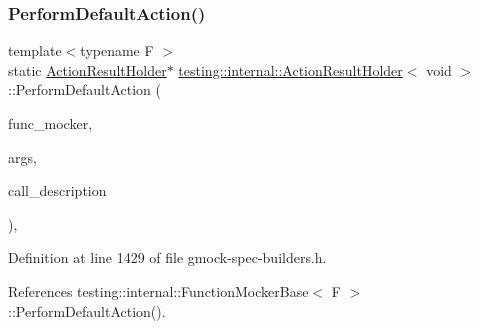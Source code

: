 \subsubsection{\texorpdfstring{Perform\+Default\+Action()}{PerformDefaultAction()}}
{\footnotesize\ttfamily template$<$typename F $>$ \\
static \hyperlink{classtesting_1_1internal_1_1ActionResultHolder}{Action\+Result\+Holder}$\ast$ \hyperlink{classtesting_1_1internal_1_1ActionResultHolder}{testing\+::internal\+::\+Action\+Result\+Holder}$<$ void $>$\+::Perform\+Default\+Action (\begin{DoxyParamCaption}\item[{const \hyperlink{classtesting_1_1internal_1_1FunctionMockerBase}{Function\+Mocker\+Base}$<$ F $>$ $\ast$}]{func\+\_\+mocker,  }\item[{const typename \hyperlink{structtesting_1_1internal_1_1Function}{Function}$<$ F $>$\+::Argument\+Tuple \&}]{args,  }\item[{const \hyperlink{namespacetesting_1_1internal_a8e8ff5b11e64078831112677156cb111}{string} \&}]{call\+\_\+description }\end{DoxyParamCaption})\hspace{0.3cm}{\ttfamily [inline]}, {\ttfamily [static]}}



Definition at line 1429 of file gmock-\/spec-\/builders.\+h.



References testing\+::internal\+::\+Function\+Mocker\+Base$<$ F $>$\+::\+Perform\+Default\+Action().


